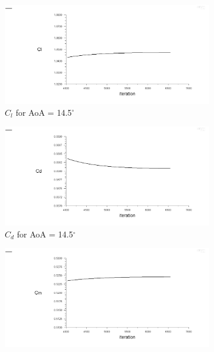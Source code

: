 \begin{figure}[H]
  \begin{subfigure}[b]{0.5\textwidth}
    \includegraphics[width=\textwidth]{14.5_deg/AoA_14_5_cl.png}
    \caption{$C_l$ for AoA = 14.5$^\circ$}
    \label{fig:aoa_14.5_cl}
  \end{subfigure}
  \hfill
  \begin{subfigure}[b]{0.5\textwidth}
    \includegraphics[width=\textwidth]{14.5_deg/AoA_14_5_cd.png}
    \caption{$C_d$ for AoA = 14.5$^\circ$}
    \label{fig:aoa_14.5_cd}
  \end{subfigure}
  \begin{subfigure}[b]{0.5\textwidth}
    \includegraphics[width=\textwidth]{14.5_deg/AoA_14_5_cm.png}

\end{subfigure}
\end{figure}
